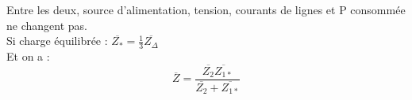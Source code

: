 \documentclass[../main.tex]{subfiles}
\begin{document}
Entre les deux, source d'alimentation, tension, courants de lignes et P consommée ne changent pas. \\
Si charge équilibrée : $\overline{Z_{*}} = \frac{1}{3}\overline{Z_{\Delta}}$\\
Et on a : 
\begin{equation}
    \overline{Z} = \frac{\overline{Z_2} \overline{Z_{1*}}}{\overline{Z_2} + \overline{Z_{1*}}}
\end{equation}
\end{document}
